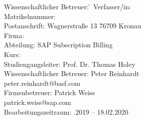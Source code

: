 \begin{titlepage}
\begin{center}
	
	\vspace{3em}
\vfill

\begin{minipage}{\textwidth}

\begin{tabbing}
	Wissenschaftlicher Betreuer: \hspace{0.85cm}\=\kill
	Verfasser/in: \> \DerAutorDerArbeit \\[1.5mm]
	Matrikelnummer:  \\[1.5mm]
	Postanschrift: \> Wagnerstraße 13 76709 Kronau  \\[1.5mm]
	Firma: \> \DerNameDerFirma  \\[1.5mm]
	Abteilung: \> SAP Subscription Billing \\[1.5mm]
	Kurs: \> \DieKursbezeichnung \\[1.5mm]
	Studiengangsleiter: \>Prof. Dr. Thomas Holey  \\[1.5mm]
	Wissenschaftlicher Betreuer: \> Peter Reinhardt \\
	\> peter.reinhardt@basf.com \\
	Firmenbetreuer: \> Patrick Weiss \\
	\> patrick.weiss@sap.com \\
	Bearbeitungszeitraum: .2019 -- 18.02.2020
\end{tabbing}
\end{minipage}

\end{center}

\end{titlepage}